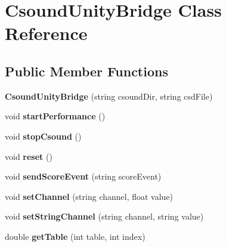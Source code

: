 \hypertarget{class_csound_unity_bridge}{}\section{Csound\+Unity\+Bridge Class Reference}
\label{class_csound_unity_bridge}
\subsection*{Public Member Functions}
\begin{DoxyCompactItemize}
\item 
\hypertarget{class_csound_unity_bridge_a563e147cf69d009e775cbf2bc01c0eb9}{}{\bfseries Csound\+Unity\+Bridge} (string csound\+Dir, string csd\+File)\label{class_csound_unity_bridge_a563e147cf69d009e775cbf2bc01c0eb9}

\item 
\hypertarget{class_csound_unity_bridge_a14e9554b96c17c2b05b286e97ab5ea6a}{}void {\bfseries start\+Performance} ()\label{class_csound_unity_bridge_a14e9554b96c17c2b05b286e97ab5ea6a}

\item 
\hypertarget{class_csound_unity_bridge_ae23b00f9d26f874055a76804bd7e9783}{}void {\bfseries stop\+Csound} ()\label{class_csound_unity_bridge_ae23b00f9d26f874055a76804bd7e9783}

\item 
\hypertarget{class_csound_unity_bridge_adf6d30943b3d27ce46fb4ae4b9ab8d91}{}void {\bfseries reset} ()\label{class_csound_unity_bridge_adf6d30943b3d27ce46fb4ae4b9ab8d91}

\item 
\hypertarget{class_csound_unity_bridge_a06ef81537f362b4cca0342d3b54f7781}{}void {\bfseries send\+Score\+Event} (string score\+Event)\label{class_csound_unity_bridge_a06ef81537f362b4cca0342d3b54f7781}

\item 
\hypertarget{class_csound_unity_bridge_af17406ffa7ac5e12e2184d7ddff5a282}{}void {\bfseries set\+Channel} (string channel, float value)\label{class_csound_unity_bridge_af17406ffa7ac5e12e2184d7ddff5a282}

\item 
\hypertarget{class_csound_unity_bridge_aa8bd5622eb055df212a43fe34eb0680e}{}void {\bfseries set\+String\+Channel} (string channel, string value)\label{class_csound_unity_bridge_aa8bd5622eb055df212a43fe34eb0680e}

\item 
\hypertarget{class_csound_unity_bridge_a2c3db966c5a11dcfc9127d789a1d19fd}{}double {\bfseries get\+Table} (int table, int index)\label{class_csound_unity_bridge_a2c3db966c5a11dcfc9127d789a1d19fd}


\end{DoxyCompactItemize}
